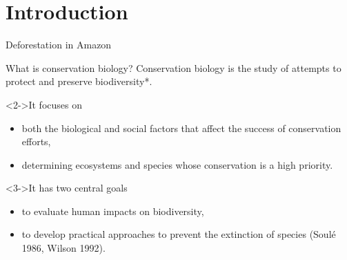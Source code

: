 \section{Introduction}
{
	\begin{frame}{Deforestation in Amazon}
	\centering
\end{frame}
}

{
	\begin{frame}[t]{What is conservation biology?}
Conservation biology is the study of attempts to protect and preserve \alert{biodiversity}*.
\begin{block}<2->{It focuses on}
	\begin{itemize}		
		\item<2-> both the biological and social factors that affect the success of conservation efforts,
		\item<2-> determining ecosystems and species whose conservation is a high priority.
	\end{itemize}
\end{block}

\begin{block}<3->{It has two central goals}
	\begin{itemize}		
		\item<3-> to evaluate human impacts on biodiversity,
		\item<3-> to develop practical approaches to prevent the extinction of species \cite{wilson1992diversity} (Soulé 1986, Wilson 1992).
	\end{itemize}
\end{block}
\end{frame}}


